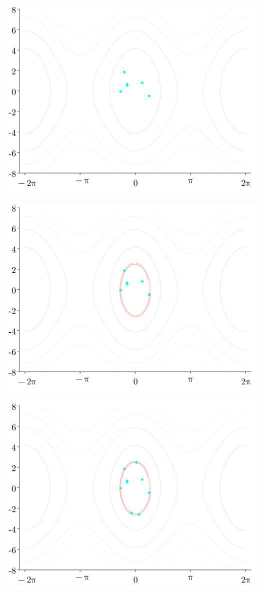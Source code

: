 \documentclass[
]{report}
\begin{document}
\includegraphics{contents/assets/neuralpbc/006.svg}

\includegraphics{contents/assets/neuralpbc/007.svg}

\includegraphics{contents/assets/neuralpbc/008.svg}
\end{document}
